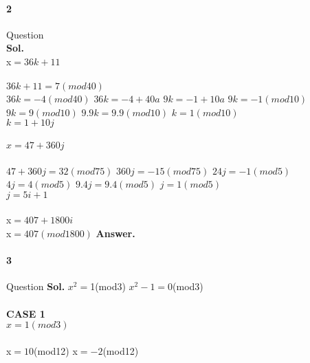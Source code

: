 \documentclass[12pt]{amsart}
\begin{document}
\paragraph*{2} Question\\
\bigskip
\textbf{Sol.}
\\
x$=36k + 11$  \in  {}   \\
\\
$36k + 11= 7(mod 40)$   \\
 $36k = -4(mod 40)$ \iff $36k = -4 + 40a $ \iff $9k = -1 + 10a $ \iff $9k = -1(mod 10) $   \in  {}\\ 
 \implies $9k = 9(mod 10) $ \iff $9.9k = 9.9(mod 10) $ \iff $k = 1(mod 10) $ \\ 
 \implies $k = 1 +10j $ \in  {} \\
 \\
 $x= 47 + 360j$  \in  {} \\
\\
$47 + 360j = 32(mod 75)$ \iff  $360j = -15(mod 75)$ \iff  $24j = -1(mod 5)$\\
\implies $ 4j = 4(mod 5)$ \iff $ 9.4j = 9.4(mod 5)$  \iff $ j = 1(mod 5)$\\
\implies $ j = 5i + 1$  \in  {}  \\
\\
x$ = 407+ 1800i $  \in  {}\\
\implies x$= 407(mod 1800)$
\textbf{ Answer.}
\bigskip
\paragraph*{3} Question
\bigskip
\textbf{Sol.} $x^{2} = $1(mod3)  \iff  $x^{2} - 1= $0(mod3) \\
\implies {}\\
\textbf{CASE 1} \\
\implies $x=1 (mod 3) $\\ \\
x$=10$(mod12) \iff x$=-2$(mod12) \\
\end{document}
